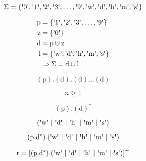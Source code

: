 \documentclass[12pt]{article}
\newcommand{\menquote}[1]{\ensuremath{\text{\textquotesingle} #1 \text{\textquotesingle}}}
\newcommand{\md}{\mathrm{d}}
\newcommand{\mz}{\mathrm{z}}
\newcommand{\mrp}{\mathrm{p}}
\begin{document}
\begin{equation*}
\Sigma = \{\menquote{0}, \menquote{1}, \menquote{2}, \menquote{3}, \dots, \menquote{9}, \menquote{\mathrm{w}}, \menquote{\mathrm{d}}, \menquote{\mathrm{h}}, \menquote{\mathrm{m}}, \menquote{\mathrm{s}}\}
\end{equation*}

\begin{equation*}
\begin{split}
\mrp & = \{\menquote{1}, \menquote{2}, \menquote{3}, \dots, \menquote{9}\} \\
\mz & = \{\menquote{0}\} \\
\md & = \mrp\cup \mz \\
\mathrm{l} & = \{\menquote{\mathrm{w}}, \menquote{\md}, \menquote{\mathrm{h}}, \menquote{\mathrm{m}}, \menquote{\mathrm{s}}\} \\
& \Rightarrow \Sigma = \md \cup \mathrm{l}
\end{split}
\end{equation*}

\begin{equation*}
(\mrp).(\md).(\md)\dots (\md)
\end{equation*}

\begin{equation*}
n \geqslant 1
\end{equation*}

\begin{equation*}
(\mrp).(\md)^*
\end{equation*}

\begin{equation*}
(\menquote{\mathrm{w}} \ \vert \ \menquote{\md} \ \vert \ \menquote{\mathrm{h}} \ \vert \ \menquote{\mathrm{m}} \ \vert \ \menquote{\mathrm{s}})
\end{equation*}

\begin{equation*}
(\mrp.\md^*).(\menquote{\mathrm{w}} \ \vert \ \menquote{\md} \ \vert \ \menquote{\mathrm{h}} \ \vert \ \menquote{\mathrm{m}} \ \vert \ \menquote{\mathrm{s}})
\end{equation*}

\begin{equation*}
\mathrm{r} = \left[ (\mrp.\md^*).(\menquote{\mathrm{w}} \ \vert \ \menquote{\md} \ \vert \ \menquote{\mathrm{h}} \ \vert \ \menquote{\mathrm{m}} \ \vert \ \menquote{\mathrm{s}})\right]^+
\end{equation*}
\end{document}
